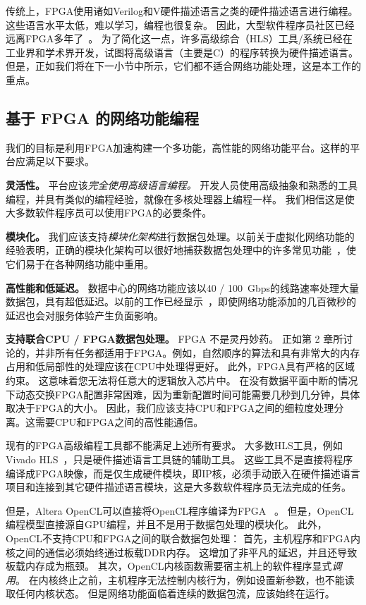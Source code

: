 传统上，FPGA使用诸如Verilog和V硬件描述语言之类的硬件描述语言进行编程。
这些语言水平太低，难以学习，编程也很复杂。
因此，大型软件程序员社区已经远离FPGA多年了~\cite {bacon2013fpga}。
为了简化这一点，许多高级综合（HLS）工具/系统已经在工业界和学术界开发，试图将高级语言（主要是C）的程序转换为硬件描述语言。
但是，正如我们将在下一小节中所示，它们都不适合网络功能处理，这是本工作的重点。

\subsection{基于 FPGA 的网络功能编程}

我们的目标是利用FPGA加速构建一个多功能，高性能的网络功能平台。这样的平台应满足以下要求。

\textbf {灵活性。} 平台应该\textit {完全使用高级语言编程。}
开发人员使用高级抽象和熟悉的工具编程，并具有类似的编程经验，就像在多核处理器上编程一样。
我们相信这是使大多数软件程序员可以使用FPGA的必要条件。

\textbf {模块化。} 我们应该支持\textit {模块化架构}进行数据包处理。以前关于虚拟化网络功能的经验表明，正确的模块化架构可以很好地捕获数据包处理中的许多常见功能~\cite {kohler2000click,martins2014clickos}，使它们易于在各种网络功能中重用。

\textbf {高性能和低延迟。} 数据中心的网络功能应该以40 / 100~Gbps的线路速率处理大量数据包，具有超低延迟。以前的工作已经显示~\cite {rollback-mb}，即使网络功能添加的几百微秒的延迟也会对服务体验产生负面影响。

\textbf {支持联合CPU / FPGA数据包处理。} FPGA 不是灵丹妙药。
正如第 2 章所讨论的，并非所有任务都适用于FPGA。例如，自然顺序的算法和具有非常大的内存占用和低局部性的处理应该在CPU中处理得更好。
此外，FPGA具有严格的区域约束。
这意味着您无法将任意大的逻辑放入芯片中。
在没有数据平面中断的情况下动态交换FPGA配置非常困难，因为重新配置时间可能需要几秒到几分钟，具体取决于FPGA的大小。
因此，我们应该支持CPU和FPGA之间的细粒度处理分离。这需要CPU和FPGA之间的高性能通信。


现有的FPGA高级编程工具都不能满足上述所有要求。
大多数HLS工具，例如 Vivado HLS~\cite{vivado}，只是硬件描述语言工具链的辅助工具。
这些工具不是直接将程序编译成FPGA映像，而是仅生成硬件模块，即IP核，必须手动嵌入在硬件描述语言项目和连接到其它硬件描述语言模块，这是大多数软件程序员无法完成的任务。

但是，Altera OpenCL可以直接将OpenCL程序编译为FPGA~ \cite {aoc}。
但是，OpenCL编程模型直接源自GPU编程，并且不是用于数据包处理的模块化。
此外，OpenCL不支持CPU和FPGA之间的联合数据包处理：
首先，主机程序和FPGA内核之间的通信必须始终通过板载DDR内存。 这增加了非平凡的延迟，并且还导致板载内存成为瓶颈。
其次，OpenCL内核函数需要宿主机上的软件程序显式\textit {调用}。
在内核终止之前，主机程序无法控制内核行为，例如设置新参数，也不能读取任何内核状态。
但是网络功能面临着连续的数据包流，应该始终在运行。


